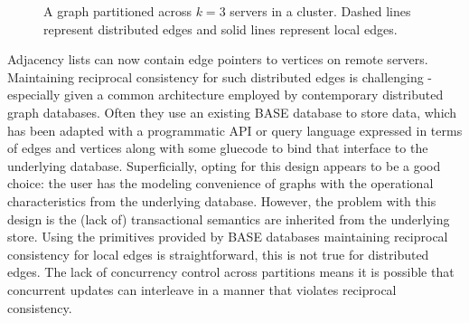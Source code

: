 \documentclass[sigplan,10pt]{acmart}
\begin{document}
\begin{figure}[ht]
  \centering
  \caption{A graph partitioned across $k=3$ servers in a cluster. Dashed lines represent distributed edges and solid lines represent local edges.}
  \label{dist-graph}
\end{figure}

Adjacency lists can now contain edge pointers to vertices on remote servers. Maintaining reciprocal consistency for such distributed edges is challenging - especially given a common architecture employed by contemporary distributed graph databases. Often they use an existing BASE database to store data, which has been adapted with a programmatic API or query language expressed in terms of edges and vertices along with some gluecode to bind that interface to the underlying database. Superficially, opting for this design appears to be a good choice: the user has the modeling convenience of graphs with the operational characteristics from the underlying database. However, the problem with this design is the (lack of) transactional semantics are inherited from the underlying store. Using the primitives provided by BASE databases maintaining reciprocal consistency for local edges is straightforward, this is not true for distributed edges. The lack of concurrency control across partitions means it is possible that concurrent updates can interleave in a manner that violates reciprocal consistency.
\end{document}
